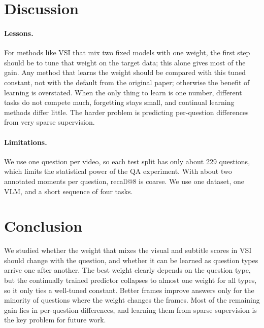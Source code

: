 \documentclass[10pt,twocolumn,letterpaper]{article}
\begin{document}
\section{Discussion}
\label{sec:discussion}

\paragraph{Lessons.}
For methods like VSI that mix two fixed models with one weight, the first step should be to tune that weight on the target data; this alone gives most of the gain.
Any method that learns the weight should be compared with this tuned constant, not with the default from the original paper; otherwise the benefit of learning is overstated.
When the only thing to learn is one number, different tasks do not compete much, forgetting stays small, and continual learning methods differ little.
The harder problem is predicting per-question differences from very sparse supervision.

\paragraph{Limitations.}
We use one question per video, so each test split has only about 229 questions, which limits the statistical power of the QA experiment.
With about two annotated moments per question, recall@8 is coarse.
We use one dataset, one VLM, and a short sequence of four tasks.

\section{Conclusion}
\label{sec:conclusion}

We studied whether the weight that mixes the visual and subtitle scores in VSI should change with the question, and whether it can be learned as question types arrive one after another.
The best weight clearly depends on the question type, but the continually trained predictor collapses to almost one weight for all types, so it only ties a well-tuned constant.
Better frames improve answers only for the minority of questions where the weight changes the frames.
Most of the remaining gain lies in per-question differences, and learning them from sparse supervision is the key problem for future work.

\FloatBarrier
{
    \small
    
    
}
\end{document}
